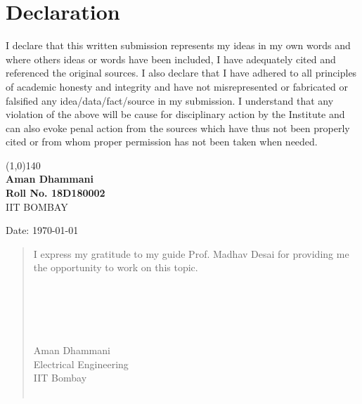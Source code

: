 \documentclass[a4paper,12pt, final]{report}
\begin{document}
\chapter*{Declaration}
I declare that this written submission represents my ideas in my own words and where others ideas or words have been included, I have adequately cited and referenced the original sources.
\newline
\newline
I also declare that I have adhered to all principles of academic honesty and integrity and have not misrepresented or fabricated or falsified any idea/data/fact/source in my submission. I understand that any violation of the above will be cause for disciplinary action by the Institute and can also evoke penal action from the sources which have thus not been  properly cited or from whom proper permission has not been taken when needed.

\vspace{3.0cm}
\begin{flushright}
\line(1,0){140}\\
\vspace*{10pt}
\textbf{Aman Dhammani} \\
\textbf{Roll No. 18D180002} \\
IIT BOMBAY
\end{flushright}
\begin{flushleft}
Date: \today
\end{flushleft}

\newpage

\renewcommand{\abstractname}{Acknowledgement}
\begin{abstract}
I express my gratitude to my guide Prof. Madhav Desai for providing me the opportunity to work on this topic. 
\\\\
\\\\
\\\\
Aman Dhammani\\
Electrical Engineering\\
IIT Bombay\\\

\end{abstract}
\end{document}
